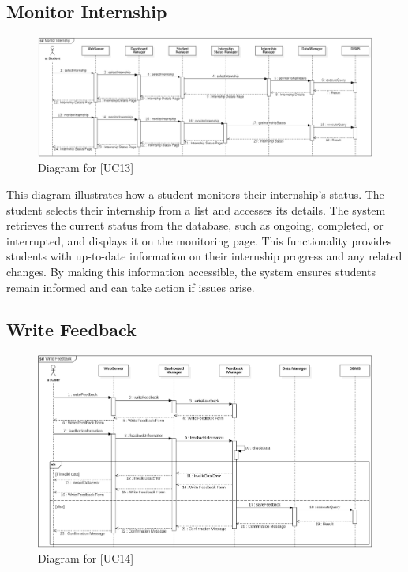 \subsection{Monitor Internship}
\begin{figure} [H]
    \centering
    \includegraphics[width=1\linewidth]{DD/Images/Runtime Sequence Diagram Images/monitor_internship.png}
    \caption{Diagram for [UC13]}
    \label{fig: Monitor Internship Diagram}
\end{figure}
This diagram illustrates how a student monitors their internship's status. The student selects their internship from a list and accesses its details. The system retrieves the current status from the database, such as ongoing, completed, or interrupted, and displays it on the monitoring page. This functionality provides students with up-to-date information on their internship progress and any related changes. By making this information accessible, the system ensures students remain informed and can take action if issues arise.

\subsection{Write Feedback}
\begin{figure} [H]
    \centering
    \includegraphics[width=1\linewidth]{DD/Images/Runtime Sequence Diagram Images/write_feedback.png}
    \caption{Diagram for [UC14]}
    \label{fig: Write Feedback Diagram}
\end{figure}

